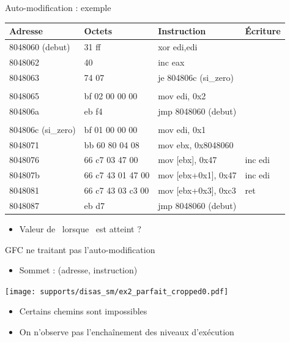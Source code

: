 \documentclass{beamer}
\begin{document}
\begin{frame}{Auto-modification : exemple}
\begin{tabular}[b]{|l|l|l|l|}
\hline
Adresse & Octets & Instruction & Écriture\\ 
\hline
 8048060 (debut)  &  31 ff             &  xor    edi,edi		& \\
 8048062  &  40                        &  inc    eax			& \\
 8048063  &  74 07                     &  je     804806c (si\_zero) 	& \\
 	  &			       &				& \\
 8048065  &  bf 02 00 00 00            &  mov    edi, 0x2 		& \\
 804806a  &  eb f4                     &  jmp    8048060 (debut) 	& \\
	  &			       &				& \\
 804806c (si\_zero) &  bf 01 00 00 00  &  mov    edi, 0x1 		& \\
 8048071  &  bb 60 80 04 08            &  mov    ebx, 0x8048060 	& \\
 8048076  &  66 c7 03 47 00            &  mov    [ebx], 0x47 		& inc edi\\
 804807b  &  66 c7 43 01 47 00         &  mov    [ebx+0x1], 0x47	& inc edi \\
 8048081  &  66 c7 43 03 c3 00         &  mov    [ebx+0x3], 0xc3	& ret \\
 8048087  &  eb d7                     &  jmp    8048060 (debut) 	& \\
\hline
\end{tabular}
\begin{itemize}
 \item Valeur de \edi\ lorsque \ret\ est atteint ?
\end{itemize}

\end{frame}

\begin{frame}{GFC ne traitant pas l'auto-modification}
\begin{itemize}
 \item Sommet : (adresse, instruction)
\end{itemize}

\begin{center}
 \texttt{[image: supports/disas\_sm/ex2\_parfait\_cropped0.pdf]}
 \end{center}
\pause
\begin{itemize}
 \item Certains chemins sont impossibles
 \item On n'observe pas l'enchaînement des niveaux d'exécution
\end{itemize}
\end{frame}
\end{document}
